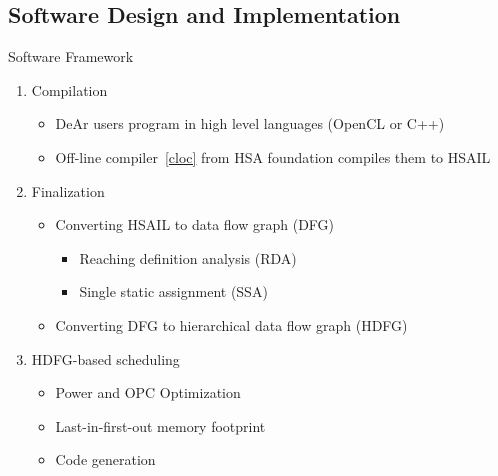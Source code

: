 \documentclass{beamer}
\begin{document}
\begin{CJK}{UTF8}{bkai}
    \subsection{Software Design and Implementation}
    \begin{frame}{Software Framework}
        \begin{enumerate}
            \item Compilation
                \begin{itemize}
                    \item DeAr users program in high level languages (OpenCL or C++)
                    \item Off-line compiler~\ref{cloc} from HSA foundation compiles them to HSAIL
                \end{itemize}
            \item Finalization
                \begin{itemize}
                    \item Converting HSAIL to data flow graph (DFG)
                        \begin{itemize}
                            \item Reaching definition analysis (RDA)
                            \item Single static assignment (SSA)
                        \end{itemize}
                    \item Converting DFG to hierarchical data flow graph (HDFG)
                \end{itemize}
            \item HDFG-based scheduling
                \begin{itemize}
                    \item Power and OPC Optimization
                    \item Last-in-first-out memory footprint
                    \item Code generation
                \end{itemize}
        \end{enumerate}
    \end{frame}


\end{CJK}
\end{document}
